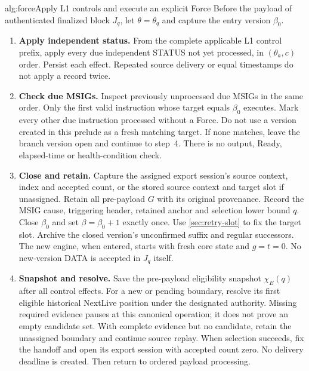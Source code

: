 \begin{protocol}{alg:force}{Apply L1 controls and execute an explicit Force}
Before the payload of authenticated finalized block $J_q$, let
$\theta=\theta_q$ and capture the entry version $\beta_0$.
\begin{enumerate}[label=\textbf{\arabic*)},itemsep=3pt]
\item \textbf{Apply independent status.}
From the complete applicable L1 control prefix, apply every due
independent STATUS not yet processed, in $(\theta_a,c)$ order.
Persist each effect. Repeated source delivery or equal timestamps
do not apply a record twice.

\item \textbf{Check due MSIGs.}
Inspect previously unprocessed due MSIGs in the same order.
Only the first valid instruction whose target equals $\beta_0$
executes. Mark every other due instruction processed without a Force.
Do not use a version created in this prelude as a fresh matching target.
If none matches, leave the branch version open and continue to step~4.
There is no output, Ready, elapsed-time or health-condition check.

\item \textbf{Close and retain.}
Capture the assigned export session's source context, index and
accepted count, or the stored source context and target slot if
unassigned. Retain all pre-payload $G$ with its original provenance.
Record the MSIG cause, triggering header, retained anchor and selection
lower bound $q$. Close $\beta_0$ and set $\beta=\beta_0+1$ exactly once.
Use \cref{sec:retry-slot} to fix the target slot. Archive the closed
version's unconfirmed suffix and regular successors.
The new engine, when entered, starts with fresh core state and $g=t=0$.
No new-version DATA is accepted in $J_q$ itself.

\item \textbf{Snapshot and resolve.}
Save the pre-payload eligibility snapshot $\chi_E(q)$ after all
control effects. For a new or pending boundary, resolve its first
eligible historical NextLive position under the designated authority.
Missing required evidence pauses at this canonical operation; it does
not prove an empty candidate set. With complete evidence but no
candidate, retain the unassigned boundary and continue source replay.
When selection succeeds, fix the handoff and open its export session
with accepted count zero. No delivery deadline is created.
Then return to ordered payload processing.
\end{enumerate}
\end{protocol}

